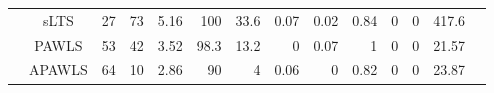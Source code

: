\documentclass{article}\usepackage[]{graphicx}\usepackage[]{color}
\begin{document}
\begin{table}[thp]
\begin{center}
\begin{tabular}{ccrrrrrrrrrrrr}
	       & sLTS & 27 & 73 & 5.16 & 
	      100 & 33.6 &
	      0.07 & 0.02 & 0.84
	      & 0 & 0 & 417.6\\
	      
	      & PAWLS & 53 & 42 & 3.52 & 
	      98.3 & 13.2 &
	      0 & 0.07 & 1
	      & 0 & 0 & 21.57\\
	      
	      & APAWLS & 64 & 10 & 2.86 & 
	      90 & 4 &
	      0.06 & 0 & 0.82
	      & 0 & 0 & 23.87\\
	      
	   \hline\hline
	
	\end{tabular}
	\end{center}
	\end{table}
	
	
\end{document}
